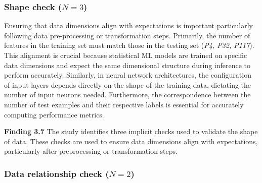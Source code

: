 \documentclass[smallextended]{svjour3}       %
\newcommand{\highlight}[1]{\begin{framed}%
  \noindent#1
\end{framed}}
\begin{document}
\subsubsection{Shape check ($N = 3$)}

Ensuring that data dimensions align with expectations is important particularly following data pre-processing or transformation steps. Primarily, the number of features in the training set must match those in the testing set (\emph{P4, P32, P117}). This alignment is crucial because statistical ML models are trained on specific data dimensions and expect the same dimensional structure during inference to perform accurately. Similarly, in neural network architectures, the configuration of input layers depends directly on the shape of the training data, dictating the number of input neurons needed. Furthermore, the correspondence between the number of test examples and their respective labels is essential for accurately computing performance metrics.

\highlight{\textbf{Finding 3.7} The study identifies three implicit checks used to validate the shape of data. These checks are used to ensure data dimensions align with expectations, particularly after preprocessing or transformation steps.}

\subsubsection{Data relationship check ($N = 2$)}~\label{sec:linear-relation-output}
\end{document}
